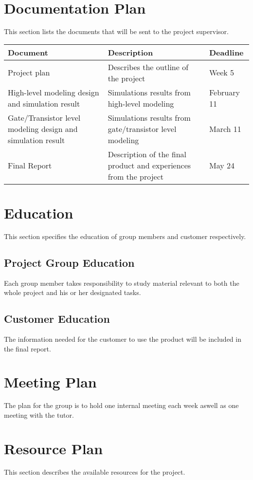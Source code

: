 \documentclass[a4paper,12pt]{article} \usepackage{graphicx}
\begin{document}
\section{Documentation Plan}
This section lists the documents that will be sent to the project supervisor.

\begin{longtable}{|p{40mm}|p{80mm}|p{30mm}|}
        \hline
        \textbf{Document} & \textbf{Description} & \textbf{Deadline} \\
        \hline
        Project plan & Describes the outline of the project & Week 5 \\
        \hline
        High-level modeling design and simulation result & Simulations results from high-level modeling & February 11 \\
        \hline
        Gate/Transistor level modeling design and simulation result  & Simulations results from gate/transistor level modeling & March 11 \\
        \hline
        Final Report & Description of the final product and experiences from the project & May 24 \\
        \hline
\end{longtable}


\section{Education}
This section specifies the education of group members and customer respectively.
\subsection{Project Group Education}
Each group member takes responsibility to study material relevant to both the
whole project and his or her designated tasks. 

\subsection{Customer Education}
The information needed for the customer to use the product will be included in
the final report.

\section{Meeting Plan}
The plan for the group is to hold one internal meeting each week aswell as one meeting with the tutor.

\section{Resource Plan} 
This section describes the available resources for the project.
\end{document}
